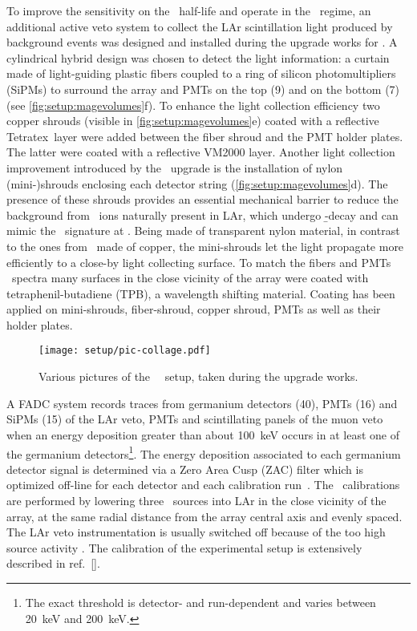 To improve the sensitivity on the \onbb\ half-life and operate in the \bkgfree\ regime, an
additional active veto system to collect the LAr scintillation light produced by
background events was designed and installed during the upgrade works for \phasetwo. A
cylindrical hybrid design was chosen to detect the light information: a curtain made of
light-guiding plastic fibers coupled to a ring of silicon photomultipliers (SiPMs) to
surround the array and PMTs on the top (9) and on the bottom (7) (see
\cref{fig:setup:magevolumes}f). To enhance the light collection efficiency two copper
shrouds (visible in \cref{fig:setup:magevolumes}e) coated with a reflective Tetratex\reg\
layer were added between the fiber shroud and the PMT holder plates. The latter were
coated with a reflective VM2000 layer. Another light collection improvement introduced by
the \phasetwo\ upgrade is the installation of nylon (mini-)shrouds enclosing each detector
string (\cref{fig:setup:magevolumes}d). The presence of these shrouds provides an
essential mechanical barrier to reduce the background from \kvz\ ions naturally present in
LAr, which undergo \b-decay and can mimic the \onbb\ signature at \qbb. Being made of
transparent nylon material, in contrast to the ones from \phaseone\ made of copper, the
mini-shrouds let the light propagate more efficiently to a close-by light collecting
surface. To match the fibers and PMTs \fillme\ spectra many surfaces in the close vicinity
of the array were coated with tetraphenil-butadiene (TPB), a wavelength shifting material.
Coating has been applied on mini-shrouds, fiber-shroud, copper shroud, PMTs as well as
their holder plates.

\begin{figure}
  \texttt{[image: setup/pic-collage.pdf]}
  \caption{%
    Various pictures of the \gerda\ \phasetwo\ setup, taken during the upgrade
    works.
  }\label{fig:setup:pictures}
\end{figure}

A FADC system records traces from germanium detectors (40), PMTs (16) and SiPMs (15) of
the LAr veto, PMTs and scintillating panels of the muon veto when an energy deposition
greater than about 100~keV occurs in at least one of the germanium detectors\footnote{The
exact threshold is detector- and run-dependent and varies between 20~keV and 200~keV.}.
The energy deposition associated to each germanium detector signal is determined via a
Zero Area Cusp (ZAC) filter which is optimized off-line for each detector and each
calibration run~\cite{Agostini2015}. The \gerda\ calibrations are performed by lowering
three \Th\ sources into LAr in the close vicinity of the array, at the same radial
distance from the array central axis and evenly spaced. The LAr veto instrumentation is
usually switched off because of the too high source activity \fillme. The calibration of
the experimental setup is extensively described in ref.~[\fillme].

